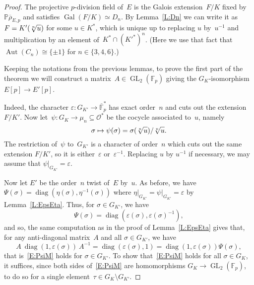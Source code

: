 \documentclass[12pt, reqno]{amsart}
\newcommand{\F}{\mathbb{F}}
\newcommand{\Fp}{\mathbb{F}_p}
\newcommand{\PP}{\mathbb{P}}
\newcommand{\rhobar}{{\overline{\rho}}}
\newcommand{\eps}{\varepsilon}
\newcommand{\calO}{\mathcal{O}}
\DeclareMathOperator{\Aut}{Aut}
\DeclareMathOperator{\Gal}{Gal}
\newcommand{\GL}{\operatorname{GL}}
\newcommand{\diag}{{\operatorname{diag}}}
\numberwithin{equation}{section}
\theoremstyle{definition}
\theoremstyle{remark}
\newcommand{\jc}[1]{{\color{darkgreen} \textsf{[JC: #1]}}}
\begin{document}
\begin{proof} 
The projective $p$-division field of~$E$ is the Galois extension~$F/K$
fixed by $\PP \rhobar_{E,p}$ and satisfies $\Gal(F/K) \simeq D_n$. By
Lemma~\ref{L:Dn} we can write it as $F=K'(\root n\of u)$ for some
$u\in K^*$, which is unique up to replacing $u$ by~$u^{-1}$ and
multiplication by an element of~$K^*\cap(K'^*)^n$.  (Here we use that
fact that~$\Aut(C_n)\cong\{\pm1\}$ for $n\in\{3,4,6\}$.)

Keeping the notations from the previous lemmas, to prove the first
part of the theorem we will construct a matrix~$A\in\GL_2(\Fp)$
giving the $G_K$-isomorphism $E[p]\to E'[p]$.

Indeed, the character $\eps:G_{K'} \to
\overline{\F}_p^*$ has exact order~$n$ and cuts out the extension
$F/K'$.
Now let~$\psi:G_K\to \mu_n\subseteq\calO^*$ be the cocycle associated
to~$u$, namely
\[
\sigma\mapsto \psi(\sigma) = \sigma(\root n\of u)/\root n\of u.
\]
The restriction of~$\psi$ to~$G_{K'}$ is a character of order~$n$
which cuts out the same extension $F/K'$, so it is either~$\eps$ or~$\eps^{-1}$.  Replacing $u$ by $u^{-1}$ if necessary, we may assume that
$\left.\psi\right|_{G_{K'}} = \eps$.

Now let $E'$ be the order~$n$ twist of~$E$ by~$u$.  As before, we have
$\Psi(\sigma)=\diag(\eta(\sigma),\eta^{-1}(\sigma))$ where
$\left.\eta\right|_{G_{K'}} = \left.\psi\right|_{G_{K'}} = \eps$ by Lemma~\ref{L:EpsEta}.
Thus, for $\sigma\in G_{K'}$, we have
\[
\Psi(\sigma) = \diag(\eps(\sigma),\eps(\sigma)^{-1}),
\]
and so, the same computation as in the proof of Lemma~\ref{L:EpsEta} 
gives that, for any anti-diagonal matrix~$A$
and all $\sigma\in G_{K'}$, we have
\[
A\ \diag(1,\eps(\sigma))\ A^{-1} = \diag(\eps(\sigma),1) =
\diag(1,\eps(\sigma)) \Psi(\sigma),
\]
that is~\eqref{E:PsiM} holds for $\sigma\in G_{K'}$.  To show
that~\eqref{E:PsiM} holds for all $\sigma\in G_{K}$, it suffices,
since both sides of~\eqref{E:PsiM} are homomorphisms $G_K\to
\GL_2(\Fp)$, to do so for a single element~$\tau\in G_K\setminus
G_{K'}$.

\begin{comment}
\jc{First version}

Note that $K' \cap K(\root n\of u) = K$; this follows from coprimality
of the degrees for $n=3$ and by our running assumption on~$u$ for $n
\in \{4,6\}$.  We can thus choose $\tau\in G_K$ such that it
fixes~$\root n\of u$ and is non-trivial when restricted to~$K'$.  Let
$A=\rhobar_{E,p}(\tau)$.  Since $\tau\notin G_{K'}$ the matrix~$A
\not\in C$ is anti-diagonal because we have diagonalized the
Cartan subgroup~$C$ and $\rhobar_{E,p}(\tau)$ is in its normalizer. Moreover,
we have $\psi(\tau)=1$ so $\Psi(\tau)=I$ and~\eqref{E:PsiM} with
$\sigma = \tau$ is trivially satisfied.


\end{comment}
\end{proof}
\end{document}
